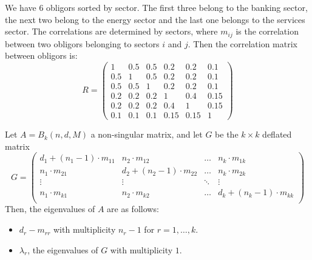 \documentclass[11pt,fleqn]{book} %
\begin{document}
\begin{example}
	\label{example1}
	We have $6$ obligors sorted by sector. The first three belong to the 
	banking sector, the next two belong to the energy sector 
	and the last one belongs to the services sector. The correlations are 
	determined by sectors, where $m_{ij}$ is the correlation between two 
	obligors belonging to sectors $i$ and $j$. Then the correlation matrix 
	between obligors is:
	\begin{displaymath}
		R=
		\left(
		\begin{array}{ccc|cc|c} 
			1   & 0.5 & 0.5 & 0.2  & 0.2  & 0.1  \\ 
			0.5 & 1   & 0.5 & 0.2  & 0.2  & 0.1  \\ 
			0.5 & 0.5 & 1   & 0.2  & 0.2  & 0.1  \\ 
			\hline
			0.2 & 0.2 & 0.2 & 1    & 0.4  & 0.15 \\ 
			0.2 & 0.2 & 0.2 & 0.4  & 1    & 0.15 \\ 
			\hline
			0.1 & 0.1 & 0.1 & 0.15 & 0.15 & 1    
		\end{array} 
		\right)
	\end{displaymath}
\end{example}

\begin{proposition}
	\label{prop1}
	Let $A = B_k(n, d, M)$ a non-singular matrix, and let $G$ be the $k \times k$ 
	deflated matrix
	\begin{displaymath}
		G =
		\left( \begin{array}{cccc}
		d_1+(n_1-1)\cdot m_{11} & n_2 \cdot m_{12}        & \dots  & n_k \cdot m_{1k} \\
		n_1\cdot m_{21}         & d_2+(n_2-1)\cdot m_{22} & \dots  & n_k \cdot m_{2k} \\
		\vdots                  & \vdots                  & \ddots & \vdots \\
		n_1\cdot m_{k1}         & n_2 \cdot m_{k2}        & \dots  & d_k+(n_k-1)\cdot m_{kk} \\
		\end{array} \right)
	\end{displaymath}
	Then, the eigenvalues of $A$ are as follows:
	\begin{itemize}
		\item $d_{r}-m_{rr}$ with multiplicity $n_r-1$ for $r=1,\dots,k$.
		\item $\lambda_r$, the eigenvalues of $G$ with multiplicity $1$.
	\end{itemize}
\end{proposition}
\end{document}
